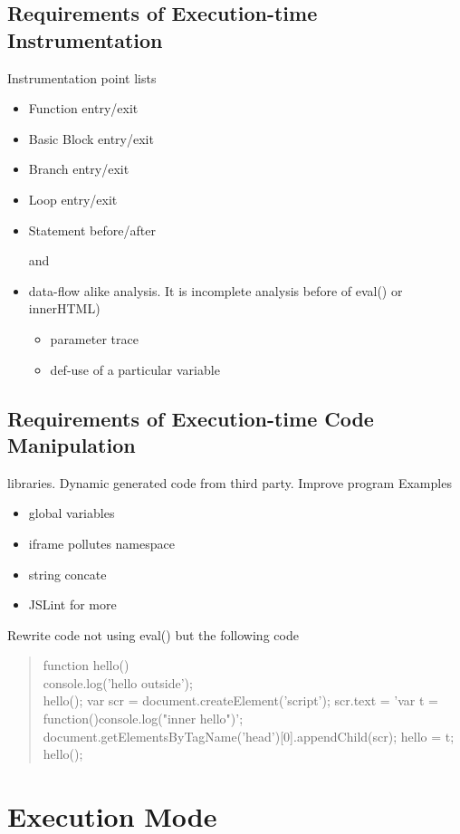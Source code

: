 \documentclass[a4paper,twocolumn,10pt]{article}
\def\denseitems{
  \itemsep1pt plus1pt minus1pt
  \parsep0pt plus0pt
  \parskip0pt\topsep0pt}
\begin{document}
\subsection{Requirements of Execution-time Instrumentation}
Instrumentation point lists
\begin{itemize}\denseitems
  \item Function entry/exit
  \item Basic Block entry/exit
  \item Branch entry/exit
  \item Loop entry/exit
  \item Statement before/after

\noindent and
  \item data-flow alike analysis. It is incomplete analysis before of eval() or innerHTML)
  \begin{itemize}\denseitems
    \item parameter trace
    \item def-use of a particular variable
  \end{itemize}
\end{itemize}


\subsection{Requirements of Execution-time Code Manipulation}
libraries. Dynamic generated code from third party. Improve program Examples
\begin{itemize}\denseitems
    \item global variables
    \item iframe pollutes namespace
    \item string concate
    \item JSLint for more
\end{itemize}

Rewrite code not using eval() but the following code
\begin{quote}
    function hello(){\\
		console.log('hello outside');\\
	}	
	hello();
	var scr = document.createElement('script');
	scr.text = 'var t = function(){console.log("inner hello")}';
	document.getElementsByTagName('head')[0].appendChild(scr);
	hello = t;
	hello();
\end{quote}



\section{Execution Mode}
\end{document}
